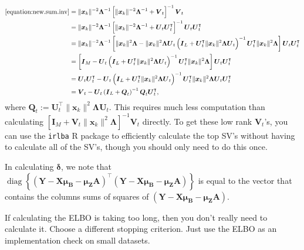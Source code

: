 \documentclass[11pt,authoryear]{article}
\DeclareMathOperator*{\diag}{diag}
\newcommand{\bs}[1]{\boldsymbol{#1}}
\begin{document}
\begin{align}
\eqref{equation:new.sum.inv} &= \|\bs{x}_k\|^{-2}\bs{\Lambda}^{-1}\left[\|\bs{x}_k\|^{-2}\bs{\Lambda}^{-1} + \bs{V}_t\right]^{-1}\bs{V}_t\\
&= \|\bs{x}_k\|^{-2}\bs{\Lambda}^{-1}\left[\|\bs{x}_k\|^{-2}\bs{\Lambda}^{-1} + \bs{U}_t\bs{U}_t^{\intercal}\right]^{-1}\bs{U}_t\bs{U}_t^{\intercal}\\
&= \|\bs{x}_k\|^{-2}\bs{\Lambda}^{-1}\left[\|\bs{x}_k\|^2\bs{\Lambda} - \|\bs{x}_k\|^2\bs{\Lambda}\bs{U}_t\left(\bs{I}_L + \bs{U}_t^{\intercal}\|\bs{x}_k\|^2\bs{\Lambda}\bs{U}_t\right)^{-1}\bs{U}_t^{\intercal}\|\bs{x}_k\|^2\bs{\Lambda}\right]\bs{U}_t\bs{U}_t^{\intercal}\\
&= \left[\bs{I}_M - \bs{U}_t\left(\bs{I}_L + \bs{U}_t^{\intercal}\|\bs{x}_k\|^2\bs{\Lambda}\bs{U}_t\right)^{-1}\bs{U}_t^{\intercal}\|\bs{x}_k\|^2\bs{\Lambda}\right]\bs{U}_t\bs{U}_t^{\intercal}\\
&= \bs{U}_t\bs{U}_t^{\intercal} - \bs{U}_t\left(\bs{I}_L + \bs{U}_t^{\intercal}\|\bs{x}_k\|^2\bs{\Lambda}\bs{U}_t\right)^{-1}\bs{U}_t^{\intercal}\|\bs{x}_k\|^2\bs{\Lambda}\bs{U}_t\bs{U}_t^{\intercal}\\
&= \bs{V}_t - \bs{U}_t\left(\bs{I}_L + \bs{Q}_t\right)^{-1}\bs{Q}_t\bs{U}_t^{\intercal},
\end{align}
where $\bs{Q}_t :=
\bs{U}_t^{\intercal}\|\bs{x}_k\|^2\bs{\Lambda}\bs{U}_t$. This requires
much less computation than calculating $\left[\bs{I}_M +
  \bs{V}_t\|\bs{x}_k\|^2\bs{\Lambda}\right]^{-1}\bs{V}_t$ directly. To
get these low rank $\bs{V}_t$'s, you can use the \texttt{irlba} R
package to efficiently calculate the top SV's without having to
calculate all of the SV's, though you should only need to do this
once.

In calculating $\bs{\delta}$, we note that
$\diag\left\{(\bs{Y}-\bs{X}\bs{\mu}_{\bs{B}} -
  \bs{\mu}_{\bs{Z}}\bs{A})^{\intercal}(\bs{Y}-\bs{X}\bs{\mu}_{\bs{B}}
  - \bs{\mu}_{\bs{Z}}\bs{A})\right\}$ is equal to the vector that
contains the columns sums of squares of
$(\bs{Y}-\bs{X}\bs{\mu}_{\bs{B}} - \bs{\mu}_{\bs{Z}}\bs{A})$.

If calculating the ELBO is taking too long, then you don't really need
to calculate it. Choose a different stopping criterion. Just use the
ELBO as an implementation check on small datasets.
\end{document}
